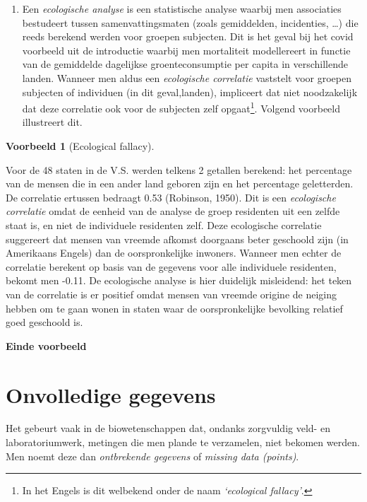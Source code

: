 \documentclass[
  12pt,dutch,coursenotes]{book}
\theoremstyle{definition}
\theoremstyle{definition}
\newtheorem{example}{Voorbeeld}[chapter]
\theoremstyle{definition}
\theoremstyle{definition}
\theoremstyle{remark}
\begin{document}
\begin{enumerate}
\item
  Een \emph{ecologische analyse} is een statistische analyse waarbij men associaties bestudeert tussen samenvattingsmaten (zoals gemiddelden, incidenties, \ldots) die reeds berekend werden voor groepen subjecten. Dit is het geval bij het covid voorbeeld uit de introductie waarbij men mortaliteit modellereert in functie van de gemiddelde dagelijkse groenteconsumptie per capita in verschillende landen. Wanneer men aldus een \emph{ecologische correlatie} vaststelt voor groepen subjecten of individuen (in dit geval,landen), impliceert dat niet noodzakelijk dat deze correlatie ook voor de subjecten zelf opgaat\footnote{In het Engels is dit welbekend onder de naam \emph{`ecological fallacy'}.}. Volgend voorbeeld illustreert dit.
\end{enumerate}

\begin{example}[Ecological fallacy]
\protect\hypertarget{exm:unnamed-chunk-126}{}{\label{exm:unnamed-chunk-126} {} }
\end{example}

Voor de 48 staten in de V.S. werden telkens 2 getallen
berekend: het percentage van de mensen die in een ander land geboren zijn en het percentage geletterden. De correlatie ertussen bedraagt 0.53 (Robinson, 1950). Dit is een \emph{ecologische correlatie} omdat de eenheid van de analyse de groep residenten uit een zelfde staat is, en niet de individuele residenten zelf. Deze ecologische correlatie suggereert dat mensen van vreemde afkomst doorgaans beter geschoold zijn (in Amerikaans Engels) dan de oorspronkelijke inwoners. Wanneer men echter de correlatie berekent op basis
van de gegevens voor alle individuele residenten, bekomt men -0.11. De ecologische analyse is hier duidelijk misleidend: het teken van de correlatie is er positief omdat mensen van vreemde origine de neiging hebben om te gaan wonen in staten waar de oorspronkelijke bevolking relatief goed geschoold is.

\textbf{Einde voorbeeld}

\hypertarget{sec:missing}{%
\section{Onvolledige gegevens}\label{sec:missing}}

Het gebeurt vaak in de biowetenschappen dat, ondanks zorgvuldig veld- en laboratoriumwerk, metingen die men plande te verzamelen, niet bekomen werden. Men noemt deze dan \emph{ontbrekende gegevens} of \emph{missing data (points)}.
\end{document}
